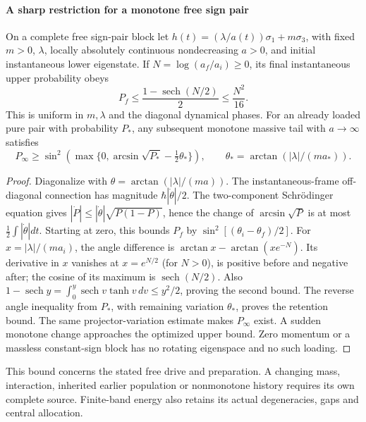 \documentclass[12pt,a4paper]{article}
\begin{document}
\paragraph{A sharp restriction for a monotone free sign pair}
\begin{theorem}
\label{p4:thm:v2217-monotone-free-loading}
On a complete free sign-pair block let
$h(t)=(\lambda/a(t))\sigma_1+m\sigma_3$, with fixed $m>0$, $\lambda$,
locally absolutely continuous nondecreasing $a>0$, and initial instantaneous
lower eigenstate. If $N=\log(a_f/a_i)\ge0$, its final instantaneous upper
probability obeys
\[
 P_f\le\frac{1-\operatorname{sech}(N/2)}2\le\frac{N^2}{16}.
\]
This is uniform in $m,\lambda$ and the diagonal dynamical phases.
For an already loaded pure pair with probability $P_*$, any subsequent
monotone massive tail with $a\to\infty$ satisfies
\[
 P_\infty\ge\sin^2\!\left(\max\{0,
       \arcsin\sqrt{P_*}-\tfrac12\theta_*\}\right),\qquad
 \theta_* =\arctan(|\lambda|/(ma_*)).
\]
\end{theorem}
\begin{proof}
Diagonalize with $\theta=\arctan(|\lambda|/(ma))$. The instantaneous-frame
off-diagonal connection has magnitude $\hbar|\dot\theta|/2$.
The two-component Schr\"odinger equation gives
$|\dot P|\le|\dot\theta|\sqrt{P(1-P)}$, hence the change of
$\arcsin\sqrt P$ is at most $\frac12\int|\dot\theta|dt$.
Starting at zero, this bounds $P_f$ by
$\sin^2[(\theta_i-\theta_f)/2]$. For $x=|\lambda|/(ma_i)$,
the angle difference is $\arctan x-\arctan(xe^{-N})$.
Its derivative in $x$ vanishes at $x=e^{N/2}$ (for $N>0$), is positive
before and negative after; the cosine of its maximum is
$\operatorname{sech}(N/2)$. Also
$1-\operatorname{sech}y=\int_0^y\operatorname{sech}v\tanh v\,dv
\le y^2/2$, proving the second bound. The reverse angle inequality from
$P_*$, with remaining variation $\theta_*$, proves the retention bound.
The same projector-variation estimate makes $P_\infty$ exist. A sudden
monotone change approaches the optimized upper bound. Zero momentum or a
massless constant-sign block has no rotating eigenspace and no such loading.
\end{proof}
This bound concerns the stated free drive and preparation. A changing mass,
interaction, inherited earlier population or nonmonotone history requires
its own complete source. Finite-band energy also retains its actual
degeneracies, gaps and central allocation.
\end{document}
